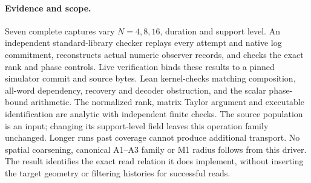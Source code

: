 \paragraph{Evidence and scope.}
Seven complete captures vary $N=4,8,16$, duration and support level.
An independent standard-library checker replays every attempt and native
log commitment, reconstructs actual numeric observer records, and checks
the exact rank and phase controls. Live verification binds these results
to a pinned simulator commit and source bytes. Lean kernel-checks matching
composition, all-word dependency, recovery and decoder obstruction, and
the scalar phase-bound arithmetic. The normalized rank, matrix Taylor
argument and executable identification are analytic with independent
finite checks. The source population is an input; changing its
support-level field leaves this operation family unchanged. Longer runs
past coverage cannot produce additional transport. No spatial coarsening,
canonical A1--A3 family or M1 radius follows from this driver. The result
identifies the exact read relation it does implement, without inserting
the target geometry or filtering histories for successful reads.
